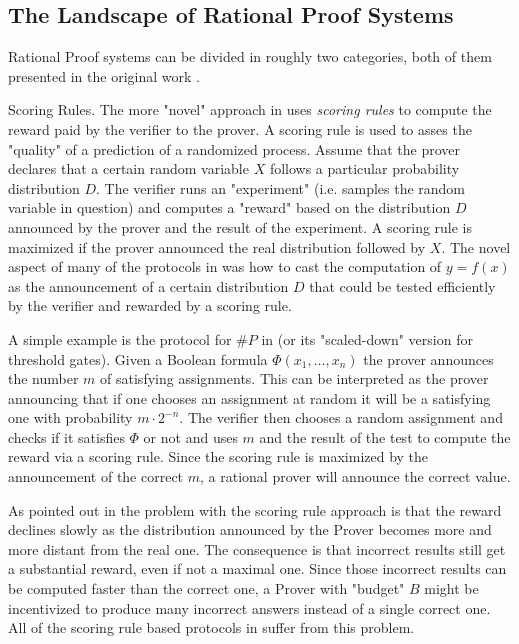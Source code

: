 \subsection{The Landscape of Rational Proof Systems}

Rational Proof systems can be divided in roughly two categories, both of them presented in the original work \cite{am}. 

\medskip
\noindent
{\sc Scoring Rules.}
The more "novel" approach in \cite{am} uses {\em scoring rules} to compute the reward paid by the verifier to the prover. A scoring rule is used to asses the "quality" of a prediction of a randomized process. Assume that the prover declares that a certain random variable $X$ follows a particular probability distribution $D$. The verifier runs an "experiment" (i.e. samples the random variable in question) and computes a "reward" based on the distribution $D$ announced by the prover and the result of the experiment. A scoring rule is maximized if the prover announced the real distribution followed by $X$. The novel aspect of many of the protocols in \cite{am} was how to cast the computation of $y=f(x)$ as the announcement of a certain distribution $D$ that could be tested efficiently by the verifier and rewarded by a scoring rule. 

A simple example is the protocol for $\#P$ in \cite{am} (or its "scaled-down" version for threshold gates). Given a Boolean formula $\Phi(x_1,\ldots,x_n)$ the prover announces the number $m$ of satisfying assignments. This can be interpreted as the prover announcing that if one chooses an assignment at random it will be a satisfying one with probability $m \cdot 2^{-n}$. The verifier then chooses a random assignment and checks if it satisfies $\Phi$ or not and uses $m$ and the result of the test to compute the reward via a scoring rule. Since the scoring rule is maximized by the announcement of the correct $m$, a rational prover will announce the correct value. 

As pointed out in \cite{cg15} the problem with the scoring rule approach is that the reward declines slowly as the distribution announced by the Prover becomes more and more distant from the real one. The consequence is that incorrect results still get a substantial reward, even if not a maximal one. Since those incorrect results can be computed faster than the correct one, a Prover with "budget" $B$ might be incentivized to produce many incorrect answers instead of a single correct one. All of the scoring rule based protocols in \cite{am,am1,ratargs,ratsumchecks} suffer from this problem. 

